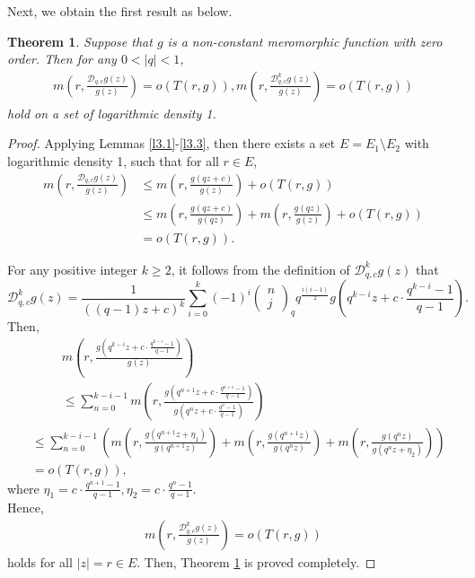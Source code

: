 \documentclass[sn-mathphys-num]{sn-jnl}%
\theoremstyle{thmstyleone}%
\newtheorem{theorem}{Theorem}%
\theoremstyle{thmstyletwo}%
\theoremstyle{thmstylethree}%
\begin{document}
\indent Next, we obtain the first result as below.

\begin{theorem}\label{thm3.1}
	Suppose that $g$ is a non-constant meromorphic function with zero order. Then for any $0<|q|<1$,
	\begin{align*}
		m\left(r,\frac{\mathcal{D}_{q,c}g(z)}{g(z)}\right)=o(T(r,g)),
		m\left(r,\frac{\mathcal{D}_{q,c}^{k}g(z)}{g(z)}\right)=o(T(r,g))
	\end{align*}
	hold on a set of logarithmic density 1.
\end{theorem}

\begin{proof}
	Applying Lemmas \ref{l3.1}-\ref{l3.3}, then there exists a set $E=E_{1}\setminus E_{2}$ with logarithmic density 1, such that for all $r\in E$,
	\begin{align*}%
		m\left(r,\frac{\mathcal{D}_{q,c}g(z)}{g(z)}\right)&\leq m\left(r,\frac{g(qz+c)}{g(z)}\right)+o(T(r,g))\nonumber\\
		&\leq m\left(r,\frac{g(qz+c)}{g(qz)}\right)+m\left(r,\frac{g(qz)}{g(z)}\right)+o(T(r,g))\\
		&=o(T(r,g)).\nonumber
	\end{align*}
	
	For any positive integer $k\geq2$, it follows from the definition of $\mathcal{D}_{q,c}^{k}g(z)$ that
	\begin{equation}\label{m1}
		\mathcal{D}_{q,c}^{k}g(z)=\frac{1}{((q-1)z+c)^{k}}\sum_{i=0}^{k}(-1)^{i}
		\begin{pmatrix}
			n \\
			j
		\end{pmatrix}_{q}q^{\frac{i(i-1)}{2}}g\left(q^{k-i}z+c\cdot\frac{q^{k-i}-1}{q-1}\right).
	\end{equation}
	\indent Then,	
	\begin{align}\label{m2}
		&~~~~~~~~~~~m\left(r,\frac{g(q^{k-i}z+c\cdot\frac{q^{k-i}-1}{q-1})}{g(z)}\right)\nonumber\\
		&~~~~~~~~~~~\leq\sum_{n=0}^{k-i-1}m\left(r,\frac{g(q^{n+1}z+c\cdot\frac{q^{n+1}-1}{q-1})}{g(q^{n}z+c\cdot\frac{q^{n}-1}{q-1})}\right)\\
		 &\leq\sum_{n=0}^{k-i-1}\left(m\left(r,\frac{g(q^{n+1}z+\eta_{1})}{g(q^{n+1}z)}\right)+m\left(r,\frac{g(q^{n+1}z)}{g(q^{n}z)}\right)+m\left(r,\frac{g(q^{n}z)}{g(q^{n}z+\eta_{2})}\right)\right)\nonumber\\
		&=o(T(r,g)),\nonumber
	\end{align}
	where $\eta_{1}=c\cdot\frac{q^{n+1}-1}{q-1}, \eta_{2}=c\cdot\frac{q^{n}-1}{q-1}$. \\
	\indent Hence,
	\begin{align*}
		m\left(r,\frac{\mathcal{D}_{q,c}^{k}g(z)}{g(z)}\right)=o(T(r,g))
	\end{align*}
	holds for all \(|z|=r\in E\). Then, Theorem \ref{thm3.1} is proved completely.
\end{proof}
\end{document}
